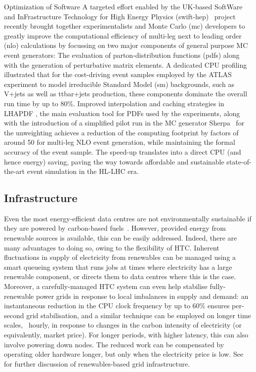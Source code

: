 \documentclass[../SustainableHEP.tex]{subfiles}
\begin{document}
\begin{bestpractice}{Optimization of Software}%
A targeted effort enabled by the UK-based SoftWare and InFrastructure Technology for High Energy Physics (\acrshort{swift-hep})~\cite{SWIFTHEP} project recently brought together experimentalists and Monte Carlo (\acrshort{mc}) developers to greatly improve the computational efficiency of multi-leg next to leading order (\acrshort{nlo}) calculations by focussing on two major components of general purpose MC event generators: The evaluation of parton-distribution functions (\acrshort{pdf}s) along with the generation of perturbative matrix elements. A dedicated CPU profiling illustrated that for the cost-driving event samples employed by the ATLAS experiment to model irreducible Standard Model (\acrshort{sm}) backgrounds, such as V+jets as well as ttbar+jets production, these components dominate the overall run time by up to 80\%. Improved interpolation and caching strategies in LHAPDF \cite{Buckley:2014ana}, the main evaluation tool for PDFs used by the experiments, along with the introduction of a simplified pilot run in the MC generator Sherpa~\cite{Sherpa} for the unweighting achieves a reduction of the computing footprint by factors of around 50 for multi-leg NLO event generation, while maintaining the formal accuracy of the event sample. The speed-up translates into a direct CPU (and hence energy) saving, paving the way towards affordable and sustainable state-of-the-art event simulation in the HL-LHC era.

\end{bestpractice}


\subsection{Infrastructure}\label{subsec:infrastructure}

Even the most energy-efficient data centres are not environmentally sustainable if they are powered by carbon-based fuels~\cite{Bloom:2022gux}.  
However, provided energy from renewable sources is available, this can be easily addressed. Indeed, there are many advantages to doing so, owing to the flexibility of HTC.
Inherent fluctuations in supply of electricity from renewables can be managed using a smart queueing system that runs jobs at times where electricity has a large renewable component,
 or directs them to data centres where this is the case.  
Moreover, a carefully-managed HTC system can even help stabilise fully-renewable power grids in response to local imbalances in supply and demand: 
an instantaneous reduction in the CPU clock frequency by up to 60\% ensures per-second grid stabilisation,
and a similar technique can be employed on longer time scales, \eg\ hourly, in response to changes in the carbon intensity of electricity (or equivalently, market price). 
For longer periods, with higher latency, this can also involve powering down nodes. 
The reduced work can be compensated by operating older hardware longer, but only when the electricity price is low.  
See  for further discussion of renewables-based grid infrastructure.  
\end{document}
